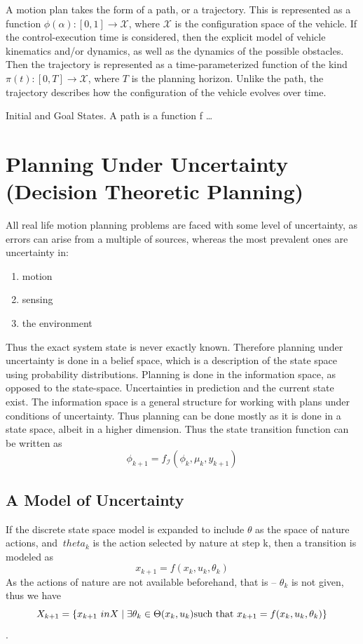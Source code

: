 A motion plan takes the form of a path, or a trajectory. This is represented as
a function \(\phi(\alpha) \colon [0,1] \rightarrow \mathcal{X}\), where
\(\mathcal{X}\) is the configuration space of the vehicle. If the
control-execution time is considered, then the explicit model of vehicle
kinematics and/or dynamics, as well as the dynamics of the possible obstacles.
Then the trajectory is represented as a time-parameterized function of the kind
\(\pi(t) \colon [0,T] \rightarrow \mathcal{X}\), where \(T\) is the planning
horizon. Unlike the path, the trajectory describes how the configuration of the
vehicle evolves over time.

Initial and Goal States. A path is a function f \ldots

\section{Planning Under Uncertainty (Decision Theoretic Planning)}

All real life motion planning problems are faced with some level of uncertainty,
as errors can arise from a multiple of sources, whereas the most prevalent ones
are uncertainty in:
\begin{enumerate}
\item motion
\item sensing
\item the environment
\end{enumerate}
Thus the exact system state is never exactly known. Therefore planning under
uncertainty is done in a belief space, which is a description of the state space
using probability distributions. Planning is done in the information space, as
opposed to the state-space. Uncertainties in prediction and the current state
exist. The information space is a general structure for working with plans under
conditions of uncertainty. Thus planning can be done mostly as it is done in a
state space, albeit in a higher dimension. Thus the state transition function
can be written as
\[
  \phi_{k+1} = f_{\mathcal{I}}\left( \phi_k, \mu_k, y_{k+1} \right)
\]

\subsection{A Model of Uncertainty}

If the discrete state space model is expanded to include \(\theta\) as the
space of nature actions, and \(\ theta_k\) is the action selected by nature at
step k, then a transition is modeled as
\[
  x_{k+1} = f(x_k,u_k,\theta_k)
\]
As the actions of nature are not available beforehand, that is -- \(\theta_ k\)
is not given, thus we have
\[
  X_{k+1} = \lbrace x_{k+1} \ in X \mid \exists\theta_k \in \Theta(x_k,u_k)
    \text{such that } x_{k+1} = f(x_k,u_k,\theta_k)\rbrace
\]\cite{Lav06}.

